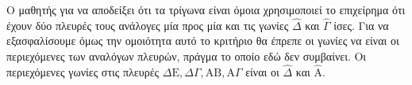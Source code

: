 \begin{alist}
\item [\beta)] Ο μαθητής για να αποδείξει ότι τα τρίγωνα είναι όμοια χρησιμοποιεί το επιχείρημα ότι έχουν δύο πλευρές τους ανάλογες μία προς μία και τις γωνίες $\hat{\Delta}$ και $\hat{\Gamma}$ ίσες. Για να εξασφαλίσουμε όμως την ομοιότητα αυτό το κριτήριο θα έπρεπε οι γωνίες να είναι οι περιεχόμενες των αναλόγων πλευρών, πράγμα το οποίο εδώ δεν συμβαίνει. Οι περιεχόμενες γωνίες στις πλευρές $\Delta \text{E}, \Delta \Gamma, \text{A}\text{B}, \text{A}\Gamma$ είναι οι $\hat{\Delta}$ και $\hat{\text{A}}$.
\end{alist}